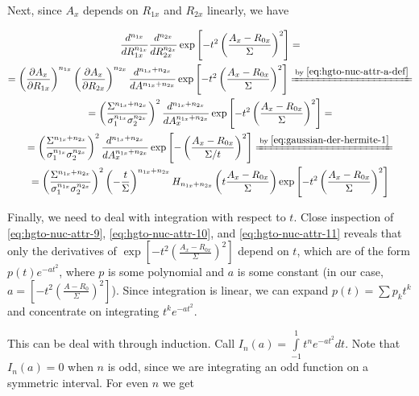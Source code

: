\documentclass{article}
\newcommand{\equalby}[1]{\xlongequal{\text{by }\eqref{#1}}}
\begin{document}
\begin{appendices}
Next, since \(A_x\) depends on \(R_{1x}\) and \(R_{2x}\) linearly, we have

\begin{equation} \label{eq:hgto-nuc-attr-11}
\begin{gathered}
\frac{d^{n_{1x}}}{dR_{1x}^{n_{1x}}}\frac{d^{n_{2x}}}{dR_{2x}^{n_{2x}}} \exp\left[ - t^2 \left(\frac{A_x-R_{0x}}{\Sigma}\right)^2 \right] = \\
= \left(\frac{\partial A_x}{\partial R_{1x}}\right)^{n_{1x}} \left(\frac{\partial A_x}{\partial R_{2x}}\right)^{n_{2x}} \frac{d^{n_{1x} + n_{2x}}}{dA^{n_{1x} + n_{2x}}} \exp\left[ - t^2 \left(\frac{A_x-R_{0x}}{\Sigma}\right)^2 \right] \equalby{eq:hgto-nuc-attr-a-def} \\
= \left(\frac{\Sigma^{n_{1x} + n_{2x}}}{\sigma_1^{n_{1x}} \sigma_2^{n_{2x}}}\right)^2 \frac{d^{n_{1x} + n_{2x}}}{dA_x^{n_{1x} + n_{2x}}} \exp\left[ - t^2 \left(\frac{A_x-R_{0x}}{\Sigma}\right)^2 \right] = \\
= \left(\frac{\Sigma^{n_{1x} + n_{2x}}}{\sigma_1^{n_{1x}} \sigma_2^{n_{2x}}}\right)^2 \frac{d^{n_{1x} + n_{2x}}}{dA_x^{n_{1x} + n_{2x}}} \exp\left[ - \left(\frac{A_x-R_{0x}}{\Sigma / t}\right)^2 \right]
\equalby{eq:gaussian-der-hermite-1} \\
= \left(\frac{\Sigma^{n_{1x} + n_{2x}}}{\sigma_1^{n_{1x}} \sigma_2^{n_{2x}}}\right)^2 
\left(-\frac{t}{\Sigma}\right)^{n_{1x} + n_{2x}}
H_{n_{1x} + n_{2x}}\left(t\frac{A_x-R_{0x}}{\Sigma}\right)
\exp\left[ - t^2 \left(\frac{A_x-R_{0x}}{\Sigma}\right)^2 \right]
\end{gathered}
\end{equation}

Finally, we need to deal with integration with respect to \(t\). Close inspection of \eqref{eq:hgto-nuc-attr-9}, \eqref{eq:hgto-nuc-attr-10}, and \eqref{eq:hgto-nuc-attr-11} reveals that only the derivatives of \(\exp\left[ - t^2 \left(\frac{A_x-R_{0x}}{\Sigma}\right)^2 \right]\) depend on \(t\), which are of the form \(p(t)e^{-at^2}\), where \(p\) is some polynomial and \(a\) is some constant (in our case, \(a = \left[ - t^2 \left(\frac{A-R_0}{\Sigma}\right)^2 \right]\)). Since integration is linear, we can expand \(p(t) = \sum p_k t^k\) and concentrate on integrating \(t^k e^{-at^2}\).

This can be deal with through induction. Call \(I_n(a) = \int\limits_{-1}^1 t^n e^{-at^2} dt\). Note that \(I_n(a) = 0\) when \(n\) is odd, since we are integrating an odd function on a symmetric interval. For even \(n\) we get


\end{appendices}
\end{document}

